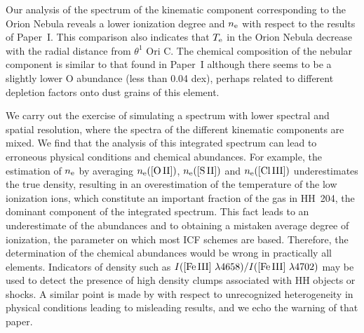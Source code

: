 \documentclass[twocolumn]{aastex63}
\begin{document}
Our analysis of the spectrum of the kinematic component corresponding to the Orion Nebula reveals a lower ionization degree and $n_{\rm e}$  with respect to the results of Paper~I. This comparison also indicates that $T_{\rm e}$ in the Orion Nebula decrease with the radial distance from $\theta^{1} \text{ Ori C}$. The chemical composition of the nebular component is similar to that found in Paper~I although there seems to be a slightly lower O abundance (less than 0.04 dex), perhaps related to different depletion factors onto dust grains of this element.

We carry out the exercise of simulating a spectrum with lower spectral and spatial resolution, where the spectra of the different kinematic components are mixed. We find that the analysis of this integrated spectrum can lead to erroneous physical conditions and chemical abundances. For example, the estimation of $n_{\rm e}$ by averaging $n_{\rm e} \text{([O\thinspace II])}$, $n_{\rm e} \text{([S\thinspace II])}$ and $n_{\rm e} \text{([Cl\thinspace III])}$ underestimates the true density, resulting in an overestimation of the temperature of the low ionization ions, which constitute an important fraction of the gas in HH~204, the dominant component of the integrated spectrum. This fact leads to an underestimate of the abundances and to obtaining a mistaken average degree of ionization, the parameter on which most ICF schemes are based. Therefore, the determination of the chemical abundances would be wrong in practically all elements. Indicators of density such as  $I(\text{[Fe\thinspace III] } \lambda 4658)/I(\text{[Fe\thinspace III] } \lambda 4702)$ may be used to detect the presence of high density clumps associated with HH objects or shocks. 
A similar point is made by \citet{ODell:2021l} with respect to unrecognized heterogeneity in physical conditions leading to misleading results, and we echo the warning of that paper.
\end{document}
